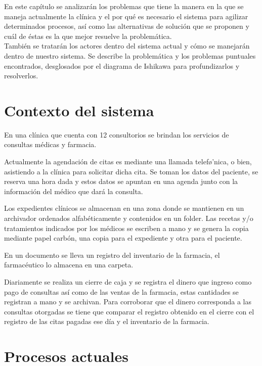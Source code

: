 En este capítulo se analizarán los problemas que tiene la manera en la que se maneja actualmente la clínica y el por qué es necesario el sistema para agilizar determinados procesos, así como las alternativas de solución que se proponen y cuál de éstas es la que mejor resuelve la problemática. \\

También se tratarán los actores dentro del sistema actual y cómo se manejarán dentro de nuestro sistema. Se describe la problemática y los problemas puntuales encontrados, desglosados por el diagrama de Ishikawa para profundizarlos y resolverlos.

\section{Contexto del sistema}

En una cl\'inica que cuenta con 12 consultorios se brindan los servicios de consultas m\'edicas y farmacia.

Actualmente la agendaci\'on de citas es mediante una llamada telef\o'nica, o bien, asistiendo a la cl\'inica para solicitar dicha cita. Se toman los datos del paciente, se reserva una hora dada y estos datos se apuntan en una agenda junto con la informaci\'on del m\'edico que dar\'a la consulta.

Los expedientes cl\'inicos se almacenan en una zona donde se mantienen en un archivador  ordenados alfab\'eticamente y contenidos en un folder.
Las recetas y/o tratamientos indicados por los m\'edicos se escriben a mano y se genera la copia mediante papel carb\'on, una copia para el expediente y otra para el paciente.

En un documento se lleva un registro del inventario de la farmacia, el farmac\'eutico lo almacena en una carpeta.

Diariamente se realiza un cierre de caja y se registra el dinero que ingreso como pago de consultas as\'i como de las ventas de la farmacia, estas cantidades se registran a mano y se archivan. Para corroborar que el dinero corresponda a las consultas otorgadas se tiene que comparar el registro obtenido en el cierre con el registro de las citas pagadas ese d\'ia y el inventario de la farmacia.

\section{Procesos actuales}

